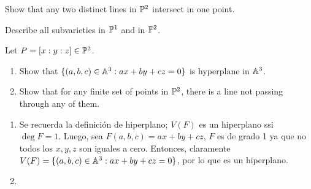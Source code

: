 \begin{sol}{4.14}

\end{sol}

\begin{prob}{4.15}
    Show that any two distinct lines in \(\mathbb{P}^2\) intersect in one point.
\end{prob}

\begin{sol}{4.15}

\end{sol}

\begin{prob}{4.23}
    Describe all subvarieties in \(\mathbb{P}^1\) and in \(\mathbb{P}^2\).
\end{prob}

\begin{sol}{4.23}

\end{sol}

\begin{prob}{4.25}
    Let \(P=[x:y:z]\in\mathbb{P}^2\).
    \begin{enumerate}
        \item Show that \(\{(a,b,c)\in\mathbb{A}^3:ax+by+cz=0\}\) is hyperplane in \(\mathbb{A}^3\).
        \item Show that for any finite set of points in \(\mathbb{P}^2\), there is a line not passing through any of them.
    \end{enumerate}
\end{prob}

\begin{sol}{4.25}
    \begin{enumerate}
        \item Se recuerda la definición de hiperplano; \(V(F)\) es un hiperplano ssi \(\deg F=1\). Luego, sea \(F(a,b,c)=ax+by+cz\), \(F\) es de grado 1 ya que no todos los \(x,y,z\) son iguales a cero. Entonces, claramente \(V(F)=\{(a,b,c)\in\mathbb{A}^3:ax+by+cz=0\}\), por lo que es un hiperplano.
        \item
    \end{enumerate}
\end{sol}

